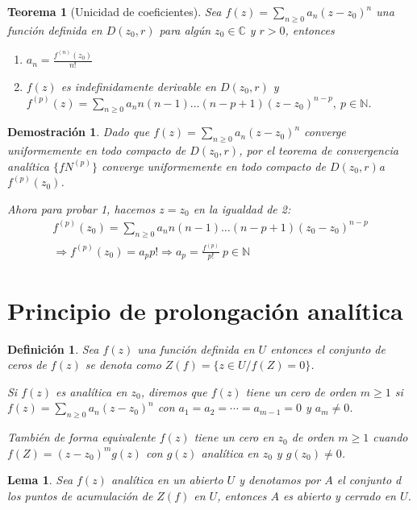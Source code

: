 \documentclass[10pt]{book}
\newtheorem{defi}{Definición}[chapter]
\newtheorem{theorem}{Teorema}[chapter]
\newtheorem*{dem}{Demostración}
\newtheorem{lema}{Lema}[chapter]
\newcommand{\C}{\mathbb{C}}
\newcommand{\N}{\mathbb{N}}
\begin{document}
\begin{theorem}[Unicidad de coeficientes]
Sea $f(z)  = \sum_{n\geq 0} a_n(z-z_0)^n$ una función definida en $D(z_0,r)$ para algún $z_0\in \C$ y $r>0$, entonces
\begin{enumerate}
\item $a_n = \frac{f^{(n)}(z_0)}{n!}$
\item $f(z)$ es indefinidamente derivable en  $D(z_0,r)$ y $f^{(p)}(z) = \sum_{n\geq 0}a_nn(n-1)\ldots (n-p+1)(z-z_0)^{n-p},\ p\in \N$.
\end{enumerate}
\end{theorem}

\begin{dem}
Dado que $f(z) = \sum_{n\geq 0} a_n(z-z_0)^n$ converge uniformemente en todo compacto de $D(z_0,r)$, por el teorema de convergencia analítica $\{fN^{(p)}\}$ converge uniformemente en todo compacto de $D(z_0,r)$a $f^{(p)}(z_0)$.

Ahora para probar 1, hacemos $z=z_0$ en la igualdad de 2:
\begin{align*}
f^{(p)}(z_0) = \sum_{n\geq 0}a_nn(n-1)\ldots (n-p+1)(z_0-z_0)^{n-p}\\
\Rightarrow f^{(p)}(z_0)= a_p p!\Rightarrow a_p = \frac{f^{(p)}}{p!}\ p\in \N
\end{align*}
\end{dem}

\section{Principio de prolongación analítica}

\begin{defi}
Sea $f(z)$ una función definida en $U$ entonces el conjunto de ceros de $f(z)$ se denota como $Z(f) = \{z\in U / f(Z) = 0\}$.

Si $f(z)$ es analítica en $z_0$, diremos que $f(z)$ tiene un cero de orden $m\geq 1$ si $f(z) = \sum_{n\geq0} a_n(z-z_0)^n$ con $a_1 = a_2 = \cdots=a_{m-1} = 0$ y $a_m \neq 0$.

También de forma equivalente $f(z)$ tiene un cero en $z_0$ de orden $m\geq 1$ cuando $f(Z) = (z-z_0)^m g(z)$ con $g(z)$ analítica en $z_0$ y $g(z_0)\neq 0$.
\end{defi}

\begin{lema}
Sea $f(z)$ analítica en un abierto $U$ y denotamos por $A$ el conjunto d los puntos de acumulación de $Z(f)$ en $U$, entonces $A$ es abierto y cerrado en $U$.
\end{lema}
\end{document}
